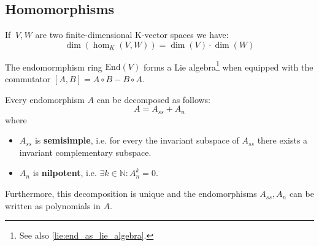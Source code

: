 \subsection{Homomorphisms}

	\begin{theorem}\label{linalgebra:hom_dimension}
	    	If $\ V,W$ are two finite-dimensional K-vector spaces we have:
        	\begin{equation}
        		\dim\left(\hom_K(V,W)\right) =\dim(V)\cdot\dim(W)
		\end{equation}
	\end{theorem}
        
	\begin{property}
		The endomormphism ring $\text{End}(V)$ forms a Lie algebra\footnote{See also \ref{lie:end_as_lie_algebra}.} when equipped with the commutator $[A, B] = A\circ B - B\circ A$.
	\end{property}
	
	\begin{property}\label{linalgebra:jordan_chevalley}
		Every endomorphism $A$ can be decomposed as follows:
		\begin{equation}
			A = A_{ss} + A_n
		\end{equation}
		where
		\begin{itemize}
			\item $A_{ss}$ is \textbf{semisimple}, i.e. for every the invariant subspace of $A_{ss}$ there exists a invariant complementary subspace.
			\item $A_n$ is \textbf{nilpotent}, i.e. $\exists k\in\mathbb{N}: A_n^k = 0$.
		\end{itemize}
		Furthermore, this decomposition is unique and the endomorphisms $A_{ss}, A_n$ can be written as polynomials in $A$.
	\end{property}
    
